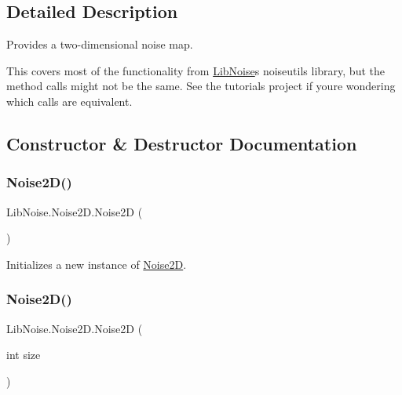 \subsection{Detailed Description}
Provides a two-\/dimensional noise map. 

This covers most of the functionality from \hyperlink{namespace_lib_noise}{Lib\+Noise}\textquotesingle{}s noiseutils library, but the method calls might not be the same. See the tutorials project if you\textquotesingle{}re wondering which calls are equivalent.

\subsection{Constructor \& Destructor Documentation}
\mbox{\label{class_lib_noise_1_1_noise2_d_a53ddafc2f6a099d939f1eaad03a1d8fa}} 
\subsubsection{\texorpdfstring{Noise2\+D()}{Noise2D()}\hspace{0.1cm}{\footnotesize\ttfamily [1/4]}}
{\footnotesize\ttfamily Lib\+Noise.\+Noise2\+D.\+Noise2D (\begin{DoxyParamCaption}{ }\end{DoxyParamCaption})\hspace{0.3cm}{\ttfamily [protected]}}



Initializes a new instance of \hyperlink{class_lib_noise_1_1_noise2_d}{Noise2D}. 

\mbox{\label{class_lib_noise_1_1_noise2_d_a8729ca7498a796e7c46317e3d40bdfa8}} 
\subsubsection{\texorpdfstring{Noise2\+D()}{Noise2D()}\hspace{0.1cm}{\footnotesize\ttfamily [2/4]}}
{\footnotesize\ttfamily Lib\+Noise.\+Noise2\+D.\+Noise2D (\begin{DoxyParamCaption}\item[{int}]{size }\end{DoxyParamCaption})}



